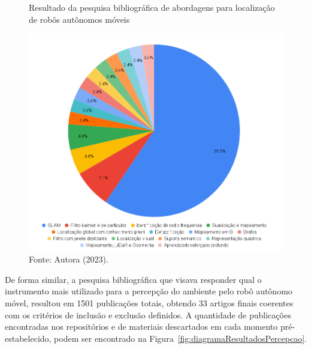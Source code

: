 \begin{figure}[h]
    \centering
    \caption{Resultado da pesquisa bibliográfica de abordagens para localização de robôs autônomos móveis}
    \includegraphics[scale=0.37]{resultadosAlgLocalizacao.png}
    \caption*{Fonte: Autora (2023).}
    \label{fig:graficoPesquisaLocalizacao}
\end{figure}

De forma similar, a pesquisa bibliográfica que visava responder qual o instrumento mais utilizado para a percepção do ambiente pelo robô autônomo móvel, resultou em 1501 publicações totais, obtendo 33 artigos finais coerentes com os critérios de inclusão e exclusão definidos. A quantidade de publicações encontradas nos repositórios e de materiais descartados em cada momento pré-estabelecido, podem ser encontrado na Figura~\ref{fig:diagramaResultadosPercepcao}. 


